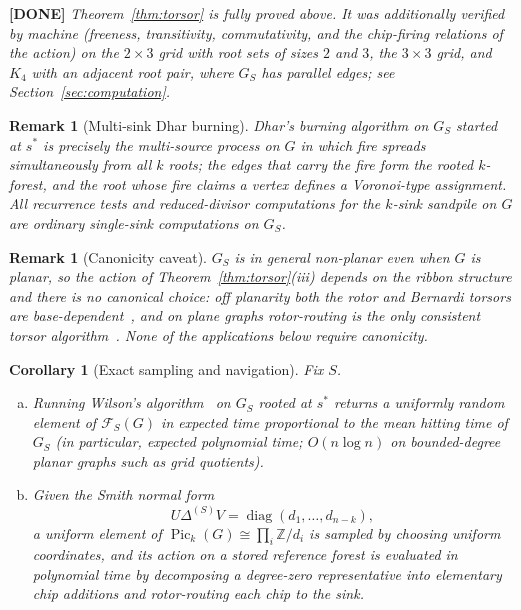 \documentclass[11pt]{article}
\newcommand{\done}[1]{\medskip\noindent\textcolor{donecol}{\textbf{[DONE]} \emph{#1}}\medskip}
\newcommand{\Z}{\mathbb{Z}}
\newcommand{\Pick}[1]{\operatorname{Pic}_k(#1)}
\newcommand{\Fcal}{\mathcal{F}}
\newtheorem{corollary}[theorem]{Corollary}
\newtheorem{remark}[theorem]{Remark}
\begin{document}
\done{Theorem~\ref{thm:torsor} is fully proved above. It was additionally
verified by machine (freeness, transitivity, commutativity, and the
chip-firing relations of the action) on the $2 \times 3$ grid with root sets
of sizes $2$ and $3$, the $3 \times 3$ grid, and $K_4$ with an adjacent root
pair, where $G_S$ has parallel edges; see Section~\ref{sec:computation}.}

\begin{remark}[Multi-sink Dhar burning]
\label{rem:dhar}
Dhar's burning algorithm on $G_S$ started at $s^*$ is precisely the
multi-source process on $G$ in which fire spreads simultaneously from all
$k$ roots; the edges that carry the fire form the rooted $k$-forest, and the
root whose fire claims a vertex defines a Voronoi-type assignment. All
recurrence tests and reduced-divisor computations for the $k$-sink sandpile
on $G$ are ordinary single-sink computations on $G_S$.
\end{remark}

\begin{remark}[Canonicity caveat]
\label{rem:canonicity}
$G_S$ is in general non-planar even when $G$ is planar, so the action of
Theorem~\ref{thm:torsor}(iii) depends on the ribbon structure and there is
no canonical choice: off planarity both the rotor and Bernardi torsors are
base-dependent~\cite{shokrieh2021torsor}, and on plane graphs rotor-routing
is the \emph{only} consistent torsor algorithm~\cite{ganguly2023rotor}. None
of the applications below require canonicity.
\end{remark}

\begin{corollary}[Exact sampling and navigation]
\label{cor:sampling}
Fix $S$.
\begin{enumerate}[(a)]
  \item Running Wilson's algorithm~\cite{wilson1996generating} on $G_S$
    rooted at $s^*$ returns a uniformly random element of $\Fcal_S(G)$ in
    expected time proportional to the mean hitting time of $G_S$ (in
    particular, expected polynomial time; $O(n \log n)$ on bounded-degree
    planar graphs such as grid quotients).
  \item Given the Smith normal form
    \[ U \Delta^{(S)} V = \operatorname{diag}(d_1, \ldots, d_{n-k}), \]
    a uniform element of $\Pick{G} \cong \prod_i \Z/d_i$ is sampled by
    choosing uniform coordinates, and its action on a stored reference
    forest is evaluated in polynomial time by decomposing a degree-zero
    representative into elementary chip additions and rotor-routing each
    chip to the sink.
\end{enumerate}
\end{corollary}
\end{document}
